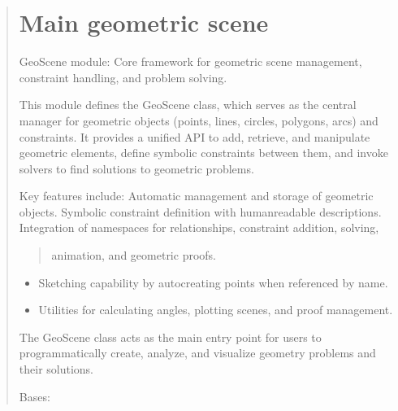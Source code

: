 \documentclass[letterpaper,10pt,english]{sphinxmanual}
\begin{document}
\begin{quote}
\sphinxAtStartPar

\sphinxstepscope


\chapter{Main geometric scene}
\label{\detokenize{pygeox:module-pygeox.geoscene}}\label{\detokenize{pygeox:main-geometric-scene}}\label{\detokenize{pygeox::doc}}
\sphinxAtStartPar
GeoScene module: Core framework for geometric scene management, constraint handling,
and problem solving.

\sphinxAtStartPar
This module defines the GeoScene class, which serves as the central manager for
geometric objects (points, lines, circles, polygons, arcs) and constraints. It
provides a unified API to add, retrieve, and manipulate geometric elements, define
symbolic constraints between them, and invoke solvers to find solutions to geometric
problems.

\sphinxAtStartPar
Key features include:
\sphinxhyphen{} Automatic management and storage of geometric objects.
\sphinxhyphen{} Symbolic constraint definition with human\sphinxhyphen{}readable descriptions.
\sphinxhyphen{} Integration of namespaces for relationships, constraint addition, solving,
\begin{quote}

\sphinxAtStartPar
animation, and geometric proofs.
\end{quote}
\begin{itemize}
\item {} 
\sphinxAtStartPar
Sketching capability by auto\sphinxhyphen{}creating points when referenced by name.

\item {} 
\sphinxAtStartPar
Utilities for calculating angles, plotting scenes, and proof management.

\end{itemize}

\sphinxAtStartPar
The GeoScene class acts as the main entry point for users to programmatically
create, analyze, and visualize geometry problems and their solutions.

\begin{fulllineitems}
\label{\detokenize{pygeox:pygeox.geoscene.GeoScene}}
\pysigstartsignatures
\pysiglinewithargsret
{}
{}
{}
\pysigstopsignatures
\sphinxAtStartPar
Bases: 


\end{fulllineitems}
\end{quote}
\end{document}
